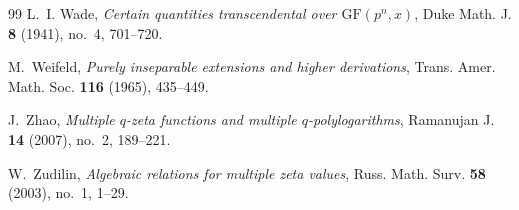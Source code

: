 \documentclass[12pt,reqno]{amsart}
\numberwithin{equation}{section}
\theoremstyle{plain}
\theoremstyle{definition}
\theoremstyle{remark}
\begin{document}
\begin{thebibliography}{99}
L.~I. Wade, \emph{Certain quantities transcendental over {$\mathrm{GF}(p^n, x)$}}, Duke Math. J. \textbf{8} (1941), no.~4, 701--720.

M.~Weifeld, \emph{Purely inseparable extensions and higher derivations}, Trans. Amer. Math. Soc. \textbf{116} (1965), 435--449.

J.~Zhao, \emph{Multiple {$q$}-zeta functions and multiple {$q$}-polylogarithms}, Ramanujan J. \textbf{14} (2007), no.~2, 189--221.

W.~Zudilin, \emph{Algebraic relations for multiple zeta values}, Russ. Math. Surv. \textbf{58} (2003), no.~1, 1--29.

\end{thebibliography}

\end{document}
